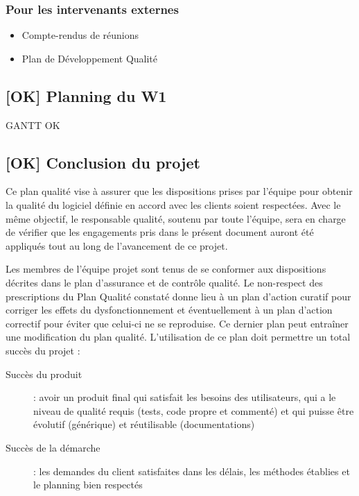 \documentclass[10pt,a4paper]{article}
\begin{document}
\subsubsection{Pour les intervenants externes}
\begin{itemize}
\item Compte-rendus de réunions 
\item Plan de Développement Qualité
\end{itemize}

\subsection{[OK] Planning du W1}

GANTT OK %

\subsection{[OK] Conclusion du projet}

Ce plan qualité vise à assurer que les dispositions prises par l’équipe pour obtenir la qualité du logiciel définie en accord avec les clients soient respectées. Avec le même objectif, le responsable qualité, soutenu par toute l’équipe, sera en charge de vérifier que les engagements pris dans le présent document auront été appliqués tout au long de l'avancement de ce projet.

Les membres de l'équipe projet sont tenus de se conformer aux dispositions décrites dans le plan d'assurance et de contrôle qualité. Le non-respect des prescriptions du Plan Qualité constaté donne lieu à un plan d'action curatif pour corriger les effets du dysfonctionnement et éventuellement à un plan d'action correctif pour éviter que celui-ci ne se reproduise. Ce dernier plan peut entraîner une modification du plan qualité. L’utilisation de ce plan doit permettre un total succès du projet :

\begin{description}
\item [Succès du produit] : avoir un produit final qui satisfait les besoins des utilisateurs, qui a le niveau de qualité requis (tests, code propre et commenté) et qui puisse être évolutif (générique) et réutilisable (documentations)
\item [Succès de la démarche] : les demandes du client satisfaites dans les délais, les méthodes établies et le planning bien respectés
\end{description}
\end{document}

